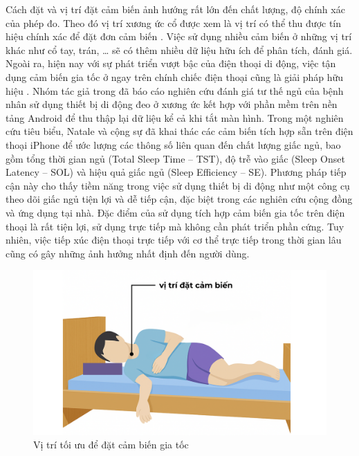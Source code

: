 Cách đặt và vị trí đặt cảm biến ảnh hướng rất lớn đến chất lượng, độ chính xác của phép đo. 
Theo đó vị trí xương ức cổ được xem là vị trí có thể thu được tín hiệu chính xác để đặt 
đơn cảm biến \cite{Zhang_osa}. Việc sử dụng nhiều cảm biến ở những vị trí khác như cổ tay, trán, … 
sẽ có thêm nhiều dữ liệu hữu ích để phân tích, đánh giá. 
Ngoài ra, hiện nay với sự phát triển vượt bậc của điện thoại di động, 
việc tận dụng cảm biến gia tốc 
ở ngay trên chính chiếc điện thoại cũng là giải pháp hữu hiệu \cite{sun2017sleepmonitor}. 
Nhóm tác giả trong \cite{Ferrer_osa} đã báo cáo nghiên cứu đánh giá tư thế ngủ 
của bệnh nhân sử dụng thiết bị di động đeo ở xương ức kết hợp với 
phần mềm trên nền tảng Android để thu thập lại dữ liệu kể cả khi tắt màn hình. 
Trong một nghiên cứu tiêu biểu, Natale và cộng sự đã khai thác các cảm biến tích 
hợp sẵn trên điện thoại iPhone để ước lượng các thông số liên 
quan đến chất lượng giấc ngủ, bao gồm tổng thời gian ngủ (Total Sleep Time – TST), 
độ trễ vào giấc (Sleep Onset Latency – SOL) và hiệu quả giấc ngủ (Sleep Efficiency – SE). 
Phương pháp tiếp cận này cho thấy tiềm năng trong việc sử dụng thiết bị di động 
như một công cụ theo dõi giấc ngủ tiện lợi và dễ tiếp cận, đặc biệt trong các nghiên 
cứu cộng đồng và ứng dụng tại nhà\cite{Natale_osa}. Đặc điểm của sử dụng tích hợp cảm biến gia tốc 
trên điện thoại là rất tiện lợi, sử dụng trực tiếp mà không cần phát triển phần cứng. 
Tuy nhiên, việc tiếp xúc điện thoại trực tiếp với cơ thể trực tiếp trong thời gian 
lâu cũng có gây những ảnh hưởng nhất định đến người dùng.

\begin{figure}[!ht]
		\centering
 		\includegraphics[width=\textwidth]{images/vị trí đặt cảm biến.png}
 		\vspace*{-7mm}
		\caption{Vị trí tối ưu để đặt cảm biến gia tốc}
		\label{position_sensor}
\end{figure}

